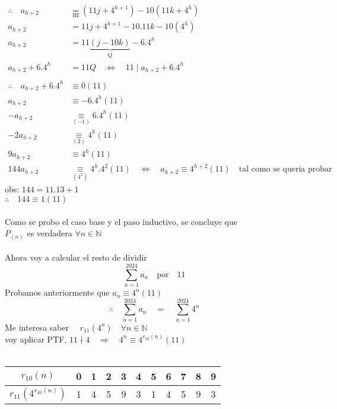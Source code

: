 \documentclass[a4paper]{article}
\begin{document}
\begin{align*}
\therefore \quad a_{h+2} &\underset{\scriptscriptstyle\text{HI}}{=} (11j + 4^{h+1}) - 10(11k + 4^h) \\
    a_{h+2} &= 11j + 4^{h+1} - 10.11k - 10(4^h) \\
    a_{h+2} &= 11 \underbrace{(j - 10k)}_{Q} - 6.4^h \\
    a_{h+2} +6.4^h &= 11Q \quad \Longleftrightarrow \quad 11 \mid a_{h+2} +6.4^h \\ \\ 
\therefore \quad a_{h+2} +6.4^h &\equiv 0 (11)\\
    a_{h+2} &\equiv -6.4^h (11) \\
    -a_{h+2} &\underset{\scriptscriptstyle(-1)}{\equiv}  6.4^h (11) \\
    -2a_{h+2} &\underset{\scriptscriptstyle(2)}{\equiv} 4^h (11) \\
    9a_{h+2} &\equiv 4^h (11) \\
    144a_{h+2} &\underset{\scriptscriptstyle(4^2)}{\equiv}  4^h.4^2 (11) \quad
    \Longleftrightarrow \quad  a_{h+2} \equiv 4^{h+2} (11) \quad 
    \text{tal como se queria probar}
\end{align*}
obs: $144 = 11.13 + 1$ \\
$\therefore \quad 144 \equiv 1 (11)$ \\ \\
Como se probo el caso base y el paso inductivo, se concluye que \\
$P_{(n)}$ es verdadera $\forall n \in \mathbb{N}$ \\ \\
Ahora voy a calcular el resto de dividir \\
\begin{equation*}
\sum_{n=1}^{2024} a_n \quad \text{por} \quad 11
\end{equation*}
Probamos anteriormente  que $a_n \equiv 4^n (11)$ \\
\begin{equation*}
\therefore \quad \sum_{n=1}^{2024}a_n  \quad = \quad  \sum_{n=1}^{2024} 4^n
\end{equation*}
Me interesa saber $ \quad r_{\scriptscriptstyle 11} (4^n)  \quad \forall n \in \mathbb{N}$ \\
voy aplicar PTF, $11 \nmid 4 \quad \Longrightarrow \quad 4^n \equiv 4^{r_{\scriptscriptstyle 10} (n)} (11)$ \\ \\
\begin{tabular}{|c|c|c|c|c|c|c|c|c|c|c|}
    \hline
    $r_{10}(n) $ & 0 & 1 & 2 & 3 & 4 & 5 & 6 & 7 & 8 & 9 \\
    \hline
    $r_{11}(4^{r_{10}(n)})$ & 1 & 4 & 5 & 9 & 3 & 1 & 4 & 5 & 9 & 3 \\
    \hline
\end{tabular} \\ \\ \\
\end{document}
